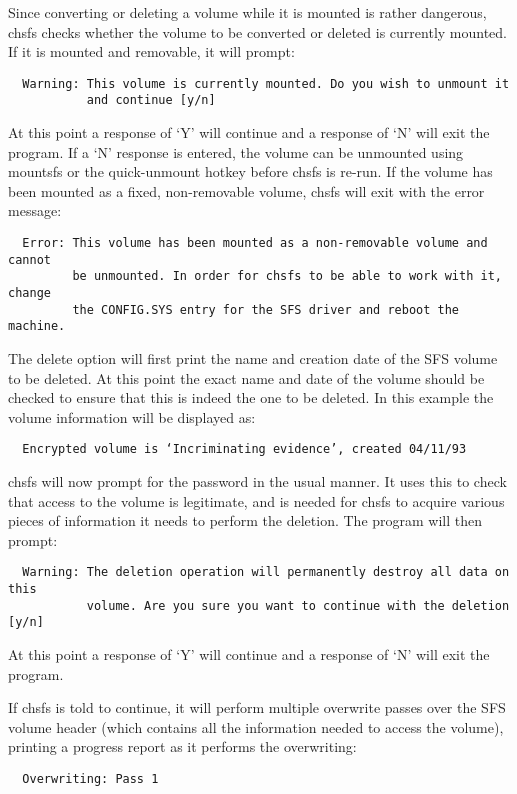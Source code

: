 Since converting or deleting a volume while it is mounted is rather dangerous,
chsfs checks whether the volume to be converted or deleted is currently
mounted.  If it is mounted and removable, it will prompt:
{\small
\begin{verbatim}
  Warning: This volume is currently mounted. Do you wish to unmount it
           and continue [y/n]
\end{verbatim}
}
At this point a response of `Y' will continue and a response of `N' will exit
the program.  If a `N' response is entered, the volume can be unmounted using
mountsfs or the quick-unmount hotkey before chsfs is re-run.  If the volume has
been mounted as a fixed, non-removable volume, chsfs will exit with the error
message:
{\small
\begin{verbatim}
  Error: This volume has been mounted as a non-removable volume and cannot
         be unmounted. In order for chsfs to be able to work with it, change
         the CONFIG.SYS entry for the SFS driver and reboot the machine.
\end{verbatim}
}
The delete option will first print the name and creation date of the SFS volume
to be deleted.  At this point the exact name and date of the volume should be
checked to ensure that this is indeed the one to be deleted.  In this example
the volume information will be displayed as:

{\tt \verb|  |Encrypted volume is `Incriminating evidence', created 04/11/93}

chsfs will now prompt for the password in the usual manner.  It uses this to
check that access to the volume is legitimate, and is needed for chsfs to
acquire various pieces of information it needs to perform the deletion.  The
program will then prompt:
{\small

\begin{verbatim}
  Warning: The deletion operation will permanently destroy all data on this
           volume. Are you sure you want to continue with the deletion [y/n]
\end{verbatim}

}
At this point a response of `Y' will continue and a response of `N' will exit
the program.

If chsfs is told to continue, it will perform multiple overwrite passes over
the SFS volume header (which contains all the information needed to access the
volume), printing a progress report as it performs the overwriting:

{\tt \verb|  |Overwriting: Pass 1}

